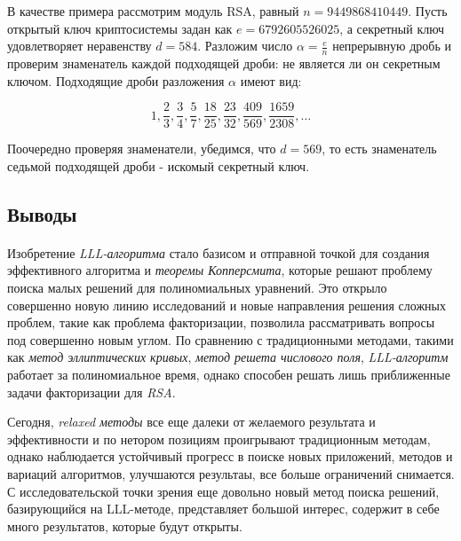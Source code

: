   \begin{example}
    В качестве примера рассмотрим модуль RSA, равный $n = 9449868410449$. Пусть открытый ключ криптосистемы задан как $e = 6792605526025$,
    а секретный ключ удовлетворяет неравенству $d = 584$. Разложим число $ \alpha = \frac{e}{n} $ непрерывную дробь и проверим знаменатель каждой 
    подходящей дроби: не является ли он секретным ключом. Подходящие дроби разложения $ \alpha $ имеют вид:
    
      \begin{equation}
	        1, \frac{2}{3}, \frac{3}{4}, \frac{5}{7}, \frac{18}{25}, \frac{23}{32}, \frac{409}{569}, \frac{1659}{2308}, \dots
      \end{equation}

    Поочередно проверяя знаменатели, убедимся, что $d = 569$, то есть знаменатель седьмой подходящей дроби - искомый секретный ключ.
  \end{example}
  
  
\subsection{Выводы}

\paragraph{} Изобретение \textit{LLL-алгоритма} стало базисом и отправной точкой для создания эффективного алгоритма и \textit{теоремы Копперсмита}, которые
  решают проблему поиска малых решений для полиномиальных уравнений. Это открыло совершенно новую линию исследований и новые направления решения
  сложных проблем, такие как проблема факторизации, позволила рассматривать вопросы под совершенно новым углом. По сравнению с
  традиционными методами, такими как \textit{метод эллиптических кривых}, \textit{метод решета числового поля}, \textit{LLL-алгоритм} работает за полиномиальное время,
  однако способен решать лишь приближенные задачи факторизации для \textit{RSA}.
  
  Сегодня, \textit{relaxed методы} все еще далеки от желаемого результата и эффективности и по нетором позициям проигрывают традиционным методам,
  однако наблюдается устойчивый прогресс в поиске новых приложений, методов и вариаций алгоритмов, улучшаются результаы, все больше ограничений
  снимается. С исследовательской точки зрения еще довольно новый метод поиска решений, базирующийся на LLL-методе, представляет большой интерес,
  содержит в себе много результатов, которые будут открыты.
  
